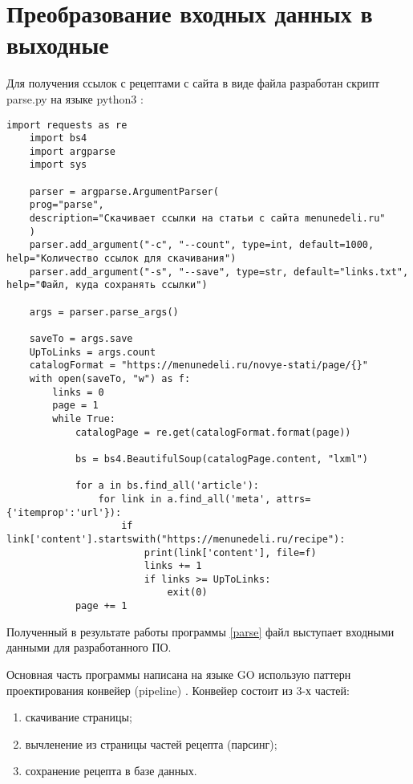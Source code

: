 \vspace{20mm}
{\let\clearpage\relax \chapter{Преобразование входных данных в выходные}}

Для получения ссылок с рецептами с сайта в виде файла разработан скрипт parse.py на языке python3 \cite{python3}:

\begin{lstlisting}[label=parse,caption={parse.py -- скрипт для получения ссылок с рецептами}]
	import requests as re
	import bs4
	import argparse
	import sys
	
	parser = argparse.ArgumentParser(
	prog="parse",
	description="Скачивает ссылки на статьи с сайта menunedeli.ru"
	)
	parser.add_argument("-c", "--count", type=int, default=1000, help="Количество ссылок для скачивания")
	parser.add_argument("-s", "--save", type=str, default="links.txt", help="Файл, куда сохранять ссылки")
	
	args = parser.parse_args()
	
	saveTo = args.save
	UpToLinks = args.count
	catalogFormat = "https://menunedeli.ru/novye-stati/page/{}"
	with open(saveTo, "w") as f:
		links = 0
		page = 1
		while True:
			catalogPage = re.get(catalogFormat.format(page))
	
			bs = bs4.BeautifulSoup(catalogPage.content, "lxml")
	
			for a in bs.find_all('article'):
				for link in a.find_all('meta', attrs={'itemprop':'url'}):
					if link['content'].startswith("https://menunedeli.ru/recipe"):
						print(link['content'], file=f)
						links += 1
						if links >= UpToLinks:
							exit(0)
			page += 1
\end{lstlisting}

Полученный в результате работы программы \ref{parse} файл выступает входными данными для разработанного ПО.

Основная часть программы написана на языке GO \cite{go} использую паттерн проектирования конвейер (pipeline) \cite{go-design}. Конвейер состоит из 3-х частей:

\begin{enumerate}
	\item скачивание страницы;
	\item вычленение из страницы частей рецепта (парсинг);
	\item сохранение рецепта в базе данных.
\end{enumerate}

